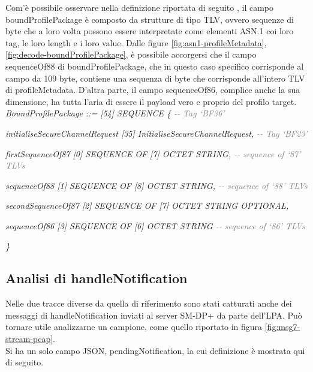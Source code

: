 \documentclass[10pt, oneside]{book}
\begin{document}
Com'è possibile osservare nella definizione riportata di seguito \cite{RSP-definitions}, il campo boundProfilePackage è composto da strutture di tipo TLV, ovvero sequenze di byte che a loro volta possono essere interpretate come elementi ASN.1 coi loro tag, le loro length e i loro value. Dalle figure \ref{fig:asn1-profileMetadata}, \ref{fig:decode-boundProfilePackage}, è possibile accorgersi che il campo sequenceOf88 di boundProfilePackage, che in questo caso specifico corrisponde al campo da 109 byte, contiene una sequenza di byte che corrisponde all'intero TLV di profileMetadata. D'altra parte, il campo sequenceOf86, complice anche la sua dimensione, ha tutta l'aria di essere il payload vero e proprio del profilo target.\\

\textit{BoundProfilePackage ::= [54] SEQUENCE \{ \textcolor{gray}{{-}{-} Tag `BF36'}}

\hspace{0.75cm} \textit{initialiseSecureChannelRequest [35] InitialiseSecureChannelRequest, \textcolor{gray}{{-}{-} Tag `BF23'}}

\hspace{0.75cm} \textit{firstSequenceOf87 [0] SEQUENCE OF [7] OCTET STRING, \textcolor{gray}{{-}{-} sequence of `87' TLVs}}

\hspace{0.75cm} \textit{sequenceOf88 [1] SEQUENCE OF [8] OCTET STRING, \textcolor{gray}{{-}{-} sequence of `88' TLVs}}

\hspace{0.75cm} \textit{secondSequenceOf87 [2] SEQUENCE OF [7] OCTET STRING OPTIONAL,}

\hspace{0.75cm} \textit{sequenceOf86 [3] SEQUENCE OF [6] OCTET STRING \textcolor{gray}{{-}{-} sequence of `86' TLVs}}

\textit{\}\\}

\subsection{Analisi di handleNotification}
Nelle due tracce diverse da quella di riferimento sono stati catturati anche dei messaggi di handleNotification inviati al server SM-DP+ da parte dell'LPA. Può tornare utile analizzarne un campione, come quello riportato in figura \ref{fig:msg7-stream-pcap}.\\
Si ha un solo campo JSON, pendingNotification, la cui definizione è mostrata qui di seguito.\\
\end{document}
